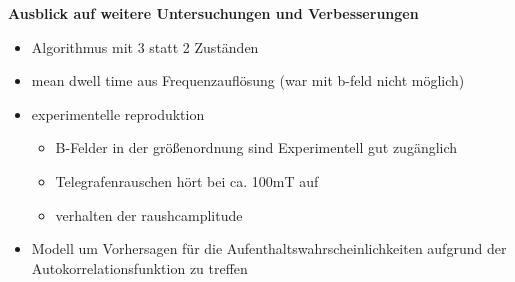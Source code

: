 \documentclass[main.tex]{subfiles}
\begin{document}
\textbf{Ausblick auf weitere Untersuchungen und Verbesserungen}
\begin{itemize}
    \item Algorithmus mit 3 statt 2 Zuständen
    \item mean dwell time aus Frequenzauflösung (war mit b-feld nicht möglich)
    \item experimentelle reproduktion
    \begin{itemize}
        \item B-Felder in der größenordnung sind Experimentell gut zugänglich
        \item Telegrafenrauschen hört bei ca. 100mT auf
        \item verhalten der raushcamplitude
    \end{itemize}
    \item Modell um Vorhersagen für die Aufenthaltswahrscheinlichkeiten aufgrund der Autokorrelationsfunktion zu treffen
\end{itemize}
\end{document}
